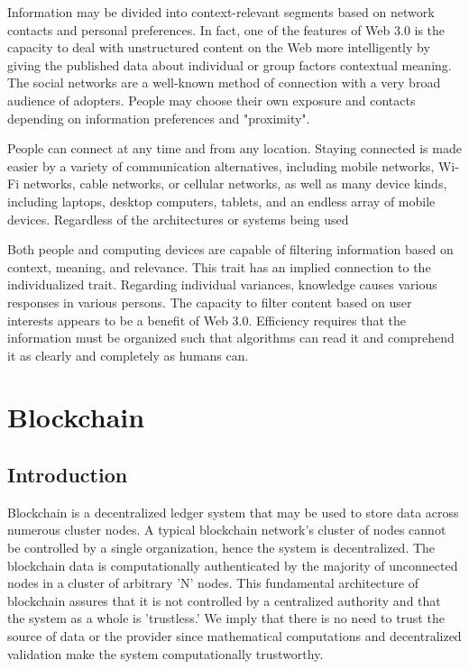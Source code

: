 \vspace{.5cm}

\begin{description} [style=nextline]

    \item[$\bullet$  Individualized]  
    Information may be divided into context-relevant segments based on network contacts and personal preferences. In fact, one of the features of Web 3.0 is the capacity to deal with unstructured content on the Web more intelligently by giving the published data about individual or group factors contextual meaning. The social networks are a well-known method of connection with a very broad audience of adopters. People may choose their own exposure and contacts depending on information preferences and "proximity".

\vspace{.5cm}

    \item[$\bullet$  Ubiquity]
  People can connect at any time and from any location. Staying connected is made easier by a variety of communication alternatives, including mobile networks, Wi-Fi networks, cable networks, or cellular networks, as well as many device kinds, including laptops, desktop computers, tablets, and an endless array of mobile devices. Regardless of the architectures or systems being used


\vspace{.5cm}


    \item[$\bullet$  Efficient]
    Both people and computing devices are capable of filtering information based on context, meaning, and relevance. This trait has an implied connection to the individualized trait. Regarding individual variances, knowledge causes various responses in various persons. The capacity to filter content based on user interests appears to be a benefit of Web 3.0. Efficiency requires that the information must be organized such that algorithms can read it and comprehend it as clearly and completely as humans can.

\end{description}
\section{Blockchain}

\subsection{Introduction}
Blockchain is a decentralized ledger system that may be used to store data across numerous cluster nodes. A typical blockchain network's cluster of nodes cannot be controlled by a single organization, hence the system is decentralized. The blockchain data is computationally authenticated by the majority of unconnected nodes in a cluster of arbitrary 'N' nodes. This fundamental architecture of blockchain assures that it is not controlled by a centralized authority and that the system as a whole is 'trustless.' We imply that there is no need to trust the source of data or the provider since mathematical computations and decentralized validation make the system computationally trustworthy.

